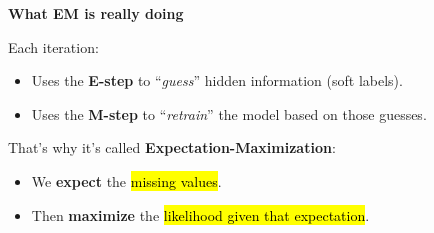\highspace
\begin{flushleft}
    \textcolor{Green3}{ \textbf{What EM is really doing}}
\end{flushleft}
Each iteration:
\begin{itemize}
    \item Uses the \textbf{E-step} to ``\emph{guess}'' hidden information (soft labels).
    \item Uses the \textbf{M-step} to ``\emph{retrain}'' the model based on those guesses.
\end{itemize}
That's why it's called \textbf{Expectation-Maximization}: 
\begin{itemize}
    \item We \textbf{expect} the \hl{missing values}.
    \item Then \textbf{maximize} the \hl{likelihood given that expectation}.
\end{itemize}